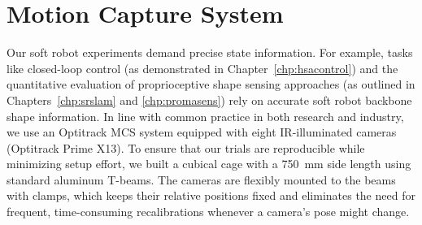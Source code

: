 \section{Motion Capture System}\label{sec:apx:infrastructure:motion_capture_system}
Our soft robot experiments demand precise state information. For example, tasks like closed-loop control (as demonstrated in Chapter~\ref{chp:hsacontrol}) and the quantitative evaluation of proprioceptive shape sensing approaches (as outlined in Chapters~\ref{chp:srslam} and \ref{chp:promasens}) rely on accurate soft robot backbone shape information. In line with common practice in both research and industry, we use an Optitrack \gls{MCS} system equipped with eight \gls{IR}-illuminated cameras (Optitrack Prime X13). To ensure that our trials are reproducible while minimizing setup effort, we built a cubical cage with a \SI{750}{mm} side length using standard aluminum T-beams. The cameras are flexibly mounted to the beams with clamps, which keeps their relative positions fixed and eliminates the need for frequent, time-consuming recalibrations whenever a camera’s pose might change.

